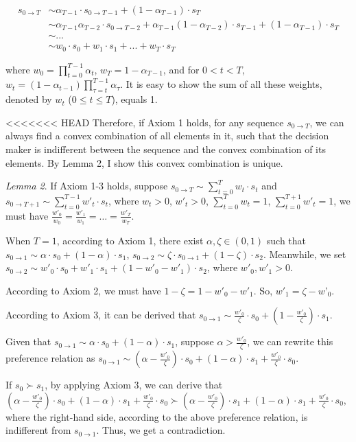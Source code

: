 \documentclass[
  12pt,
]{article}
\begin{document}
\[
\begin{aligned}
s_{0\rightarrow T} &\sim \alpha_{T-1}\cdot s_{0\rightarrow T-1} + (1-\alpha_{T-1})\cdot s_T \\
&\sim  \alpha_{T-1}\alpha_{T-2}\cdot s_{0\rightarrow T-2} + \alpha_{T-1}(1-\alpha_{T-2})\cdot s_{T-1} + (1-\alpha_{T-1})\cdot s_T \\
& \sim ...\\
& \sim w_0 \cdot s_0 + w_1\cdot s_1 +... +w_T\cdot s_T
\end{aligned}
\]

where \(w_0=\prod_{t=0}^{T-1}\alpha_t\), \(w_T = 1-\alpha_{T-1}\), and
for \(0<t<T\),
\(w_t=(1-\alpha_{t-1})\prod_{\tau=t}^{T-1}\alpha_{\tau}\). It is easy to
show the sum of all these weights, denoted by \(w_t\)
(\(0\leq t\leq T\)), equals 1.

<<<<<<< HEAD
Therefore, if Axiom 1 holds, for any sequence \(s_{0\rightarrow T}\), we
can always find a convex combination of all elements in it, such that
the decision maker is indifferent between the sequence and the convex
combination of its elements. By Lemma 2, I show this convex combination
is unique.

\emph{Lemma 2}. If Axiom 1-3 holds, suppose
\(s_{0\rightarrow T}\sim \sum_{t=0}^T w_t \cdot s_t\) and
\(s_{0\rightarrow T+1} \sim \sum_{t=0}^{T-1} w'_t\cdot s_t\), where
\(w_t >0\), \(w'_t>0\), \(\sum_{t=0}^Tw_t=1\),
\(\sum_{t=0}^{T+1}w'_t=1\), we must have
\(\frac{w'_0}{w_0}=\frac{w'_1}{w_1}=…=\frac{w'_T}{w_T}\).

When \(T=1\), according to Axiom 1, there exist
\(\alpha,\zeta \in (0,1)\) such that
\(s_{0 \rightarrow 1}\sim\alpha\cdot s_0 + (1-\alpha)\cdot s_1\),
\(s_{0\rightarrow 2} \sim \zeta\cdot s_{0\rightarrow 1} + (1-\zeta)\cdot s_2\).
Meanwhile, we set
\(s_{0\rightarrow 2} \sim w'_0\cdot s_0 + w'_1\cdot s_1 + (1-w'_0-w'_1)\cdot s_2\),
where \(w'_0, w'_1 > 0\).

According to Axiom 2, we must have \(1-\zeta=1-w'_0-w'_1\). So,
\(w'_1=\zeta-w’_0\).

According to Axiom 3, it can be derived that
\(s_{0\rightarrow 1} \sim \frac{w'_0}{\zeta}\cdot s_0 + (1-\frac{w'_0}{\zeta})\cdot s_1\).

Given that
\(s_{0\rightarrow 1}\sim\alpha\cdot s_0 + (1-\alpha)\cdot s_1\), suppose
\(\alpha > \frac{w'_0}{\zeta}\), we can rewrite this preference relation
as
\(s_{0\rightarrow 1}\sim(\alpha-\frac{w'_0}{\zeta})\cdot s_0 +(1-\alpha)\cdot s_1 + \frac{w'_0}{\zeta}\cdot s_0\).

If \(s_0 \succ s_1\), by applying Axiom 3, we can derive that
\((\alpha-\frac{w'_0}{\zeta})\cdot s_0 +(1-\alpha)\cdot s_1 + \frac{w'_0}{\zeta}\cdot s_0 \succ (\alpha-\frac{w'_0}{\zeta})\cdot s_1 +(1-\alpha)\cdot s_1 + \frac{w'_0}{\zeta}\cdot s_0\),
where the right-hand side, according to the above preference relation,
is indifferent from \(s_{0\rightarrow 1}\). Thus, we get a
contradiction.
\end{document}
